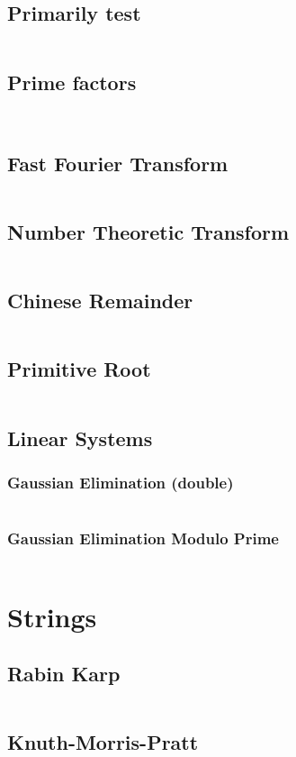 \documentclass[a4paper, 10pt, twocolumn, landscape]{article}
\begin{document}
  \subsection{Primarily test}
  \inputminted{cpp}{math/miller-rabin.cpp}
  \subsection{Prime factors}
  \inputminted{cpp}{math/prime-factors.cpp}
  \inputminted{cpp}{math/pollard-rho.cpp}
  \subsection{Fast Fourier Transform}
  \inputminted{cpp}{math/fft.cpp}
  \subsection{Number Theoretic Transform}
  \inputminted{cpp}{math/ntt.cpp}
  \subsection{Chinese Remainder}
  \inputminted{cpp}{math/chinese.cpp}
  \subsection{Primitive Root}
  \inputminted{cpp}{math/primitive-root.cpp}
  \subsection{Linear Systems}
  \subsubsection{Gaussian Elimination (double)}
  \inputminted{cpp}{math/gauss-elim.cpp}
  \subsubsection{Gaussian Elimination Modulo Prime}
  \inputminted{cpp}{math/gauss-elim-prime.cpp}

  \section{Strings}
  \subsection{Rabin Karp}
  \inputminted{cpp}{strings/rabin-karp.cpp}
  \subsection{Knuth-Morris-Pratt}
  \inputminted{cpp}{strings/kmp.cpp}
\end{document}
